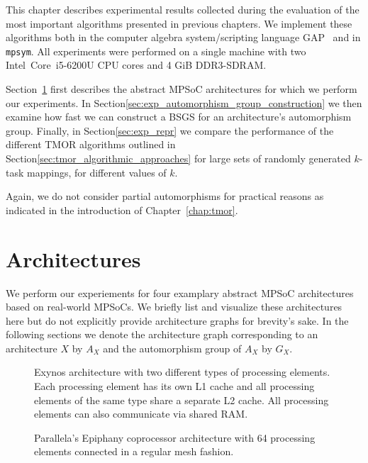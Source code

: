 This chapter describes experimental results collected during the evaluation of
the most important algorithms presented in previous chapters.  We implement
these algorithms both in the computer algebra system/scripting language
GAP~\cite{GAP4} and in \texttt{mpsym}. All experiments were performed on a
single machine with two Intel\textregistered\ Core\texttrademark\ i5-6200U CPU
cores and 4 GiB DDR3-SDRAM.

Section~\ref{sec:exp_mpsoc_architectures} first describes the abstract MPSoC
architectures for which we perform our experiments. In
Section\ref{sec:exp_automorphism_group_construction} we then examine how fast
we can construct a BSGS for an architecture's automorphism group. Finally, in
Section\ref{sec:exp_repr} we compare the performance of the different TMOR
algorithms outlined in Section\ref{sec:tmor_algorithmic_approaches} for large
sets of randomly generated $k$-task mappings, for different values of $k$.

Again, we do not consider partial automorphisms for practical reasons as
indicated in the introduction of Chapter~\ref{chap:tmor}.

\section{Architectures}
\label{sec:exp_mpsoc_architectures}

We perform our experiements for four examplary abstract MPSoC architectures
based on real-world MPSoCs. We briefly list and visualize these architectures
here but do not explicitly provide architecture graphs for brevity's sake.  In
the following sections we denote the architecture graph corresponding to an
architecture $X$ by $A_X$ and the automorphism group of $A_X$ by $G_X$.

\begin{figure}
  \centering
  \caption{Exynos architecture with two different types of processing elements.
           Each processing element has its own L1 cache and all processing
           elements of the same type share a separate L2 cache. All processing
           elements can also communicate via shared RAM.}
  \label{fig:exynos}
\end{figure}

\begin{figure}
  \centering
  \caption{Parallela's Epiphany coprocessor architecture with 64 processing
           elements connected in a regular mesh fashion.}
  \label{fig:parallella}
\end{figure}

